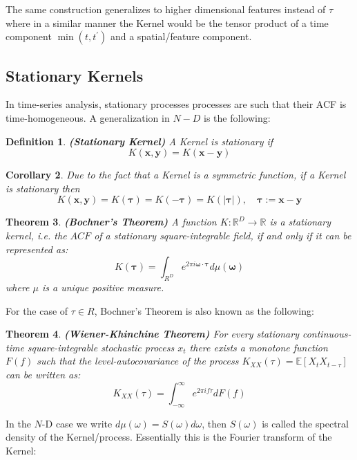 \documentclass[11pt]{article}
\theoremstyle{plain} %
\newtheorem{theorem}{Theorem}[section]
\newtheorem{corollary}[theorem]{Corollary}
\newtheorem{definition}[theorem]{Definition}
\theoremstyle{remark}
\begin{document}
The same construction generalizes to higher dimensional features instead of
$\tau$ where in a similar manner the Kernel would be the tensor product of a
time component $\min \left(t, t^{\prime}\right)$ and a spatial/feature component.

\subsection{Stationary Kernels}
In time-series analysis, stationary processes processes are such that their ACF
is time-homogeneous. A generalization in $N-D$ is the following:

\begin{definition}\textbf{(Stationary Kernel)}
  A Kernel is stationary if $$K(\mathbf{x}, \mathbf{y})=K(\mathbf{x}-\mathbf{y})$$
\end{definition}

\begin{corollary}
  Due to the fact that a Kernel is a symmetric function, if a Kernel is stationary then
  $$K(\mathbf{x},
    \mathbf{y})=K(\boldsymbol{\tau})=K(-\boldsymbol{\tau})=K(|\boldsymbol{\tau}|),
    \quad \boldsymbol{\tau}:=\mathbf{x}-\mathbf{y}$$
\end{corollary}

\begin{theorem}
  \textbf{(Bochner's Theorem)} A function $K: \mathbb{R}^{D} \rightarrow \mathbb{R}$ is a stationary kernel,
  i.e. the $A C F$ of a stationary square-integrable field, if and only if it can
  be represented as:
  $$
    K(\boldsymbol{\tau})=\int_{R^{D}} e^{2 \pi i \boldsymbol{\omega} \cdot \boldsymbol{\tau}} d \mu(\boldsymbol{\omega})
  $$
  where $\mu$ is a unique positive measure.
\end{theorem}

For the case of $\tau \in R$, Bochner's Theorem is also known as the following:
\begin{theorem}
  \textbf{(Wiener-Khinchine Theorem)} For every stationary continuous-time square-integrable stochastic process
  $x_{t}$ there exists a monotone function $F(f)$ such that the
  level-autocovariance of the process $K_{X X}(\tau)=\mathbb{E}\left[X_{t}
      X_{t-\tau}\right]$ can be written as:
  $$
    K_{X X}(\tau)=\int_{-\infty}^{\infty} e^{2 \pi i f \tau} d F(f)
  $$
\end{theorem}

In the $N$-D case we write $d \mu(\omega)=S(\omega) d \omega$, then $S(\omega)$
is called the spectral density of the Kernel/process. Essentially this is the
Fourier transform of the Kernel:
\end{document}
